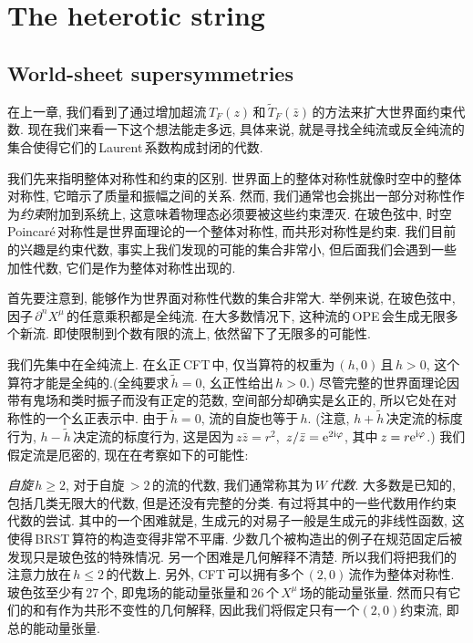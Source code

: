 \chapter{The heterotic string}

\section{World-sheet supersymmetries}

在上一章, 我们看到了通过增加超流$\,T_{F}(z)\,$和$\,\tilde{T}_{F}(\bar{z})\,$的方法来扩大世界面约束代数. 现在我们来看一下这个想法能走多远, 具体来说, 就是寻找全纯流或反全纯流的集合使得它们的\,Laurent\,系数构成封闭的代数.

我们先来指明整体对称性和约束的区别. 世界面上的整体对称性就像时空中的整体对称性, 它暗示了质量和振幅之间的关系. 然而, 我们通常也会挑出一部分对称性作为{\emph{约束}}附加到系统上, 这意味着物理态必须要被这些约束湮灭. 在玻色弦中, 时空\,Poincar\'{e}\,对称性是世界面理论的一个整体对称性, 而共形对称性是约束. 我们目前的兴趣是约束代数, 事实上我们发现的可能的集合非常小, 但后面我们会遇到一些加性代数, 它们是作为整体对称性出现的. 

首先要注意到, 能够作为世界面对称性代数的集合非常大. 举例来说, 在玻色弦中, 因子$\,\partial^{n}X^{\mu}\,$的任意乘积都是全纯流. 在大多数情况下, 这种流的\,OPE\,会生成无限多个新流. 即使限制到个数有限的流上, 依然留下了无限多的可能性.

我们先集中在全纯流上. 在幺正\,CFT\,中, 仅当算符的权重为$\,(h,0)\,$且$\,h>0$, 这个算符才能是全纯的.(全纯要求$\,\tilde{h}=0$, 幺正性给出$\,h>0$.) 尽管完整的世界面理论因带有鬼场和类时振子而没有正定的范数, 空间部分却确实是幺正的, 所以它处在对称性的一个幺正表示中. 由于$\,\tilde{h}=0$, 流的自旋也等于$\,h$. (注意, $h+\tilde{h}$\,决定流的标度行为, $h-\tilde{h}\,$决定流的标度行为, 这是因为$\,z\bar{z}=r^{2}$, $\,z/\bar{z}=\mathrm{e}^{2\mathrm{i}\varphi}$, 其中$\,z=r\mathrm{e}^{\mathrm{i}\varphi}$.) 我们假定流是厄密的, 现在在考察如下的可能性:

{\emph{自旋}}$\,h\geq 2$, 对于自旋$\,>2\,$的流的代数, 我们通常称其为$\,W\,${\emph{代数}}. 大多数是已知的, 包括几类无限大的代数, 但是还没有完整的分类. 有过将其中的一些代数用作约束代数的尝试. 其中的一个困难就是, 生成元的对易子一般是生成元的非线性函数, 这使得\,BRST\,算符的构造变得非常不平庸. 少数几个被构造出的例子在规范固定后被发现只是玻色弦的特殊情况. 另一个困难是几何解释不清楚. 所以我们将把我们的注意力放在$\,h\leq 2\,$的代数上. 另外, CFT\,可以拥有多个$\,(2,0)\,$流作为整体对称性. 玻色弦至少有\,27\,个, 即鬼场的能动量张量和\,26\,个$\,X^{\mu}\,$场的能动量张量. 然而只有它们的和有作为共形不变性的几何解释, 因此我们将假定只有一个$(2,0)$约束流, 即总的能动量张量.

